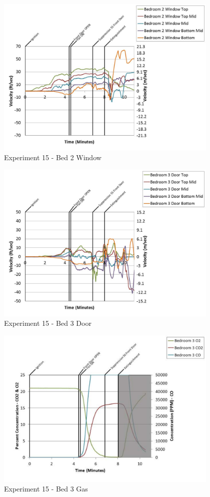 \documentclass{article}
\begin{document}
\begin{appendices}
	\clearpage

	\begin{figure}[h!]
		\centering
		\includegraphics[height=3.05in]{0_Images/Results_Charts/Exp_15_Charts/Bed2Window.pdf}
		\caption{Experiment 15 - Bed 2 Window}
	\end{figure}
 

	\begin{figure}[h!]
		\centering
		\includegraphics[height=3.05in]{0_Images/Results_Charts/Exp_15_Charts/Bed3Door.pdf}
		\caption{Experiment 15 - Bed 3 Door}
	\end{figure}
 
	\clearpage

	\begin{figure}[h!]
		\centering
		\includegraphics[height=3.05in]{0_Images/Results_Charts/Exp_15_Charts/Bed3Gas.pdf}
		\caption{Experiment 15 - Bed 3 Gas}
	\end{figure}
 


\end{appendices}
\end{document}

